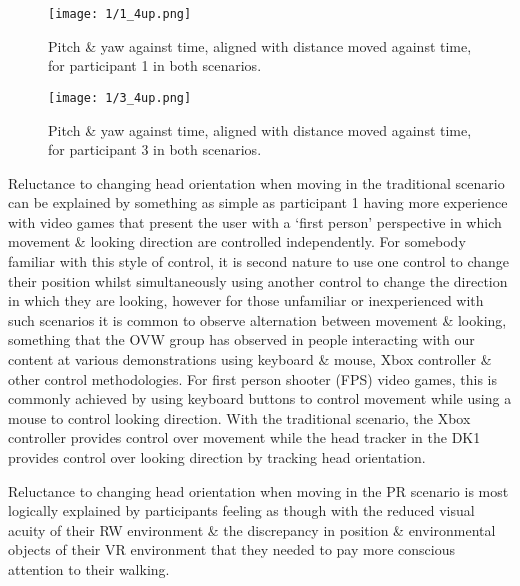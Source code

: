 \begin{figure}
	\begin{center}
	\texttt{[image: 1/1\_4up.png]}
	\caption{Pitch \& yaw against time, aligned with distance moved against time, for participant 1 in both scenarios.}
	\label{1_4up.png}
	\end{center}
\end{figure}

\begin{figure}
	\begin{center}
	\texttt{[image: 1/3\_4up.png]}
	\caption{Pitch \& yaw against time, aligned with distance moved against time, for participant 3 in both scenarios.}
	\label{3_4up.png}
	\end{center}
\end{figure}

Reluctance to changing head orientation when moving in the traditional scenario can be explained by something as simple as participant 1 having more experience with video games that present the user with a `first person' perspective in which movement \& looking direction are controlled independently. For somebody familiar with this style of control, it is second nature to use one control to change their position whilst simultaneously using another control to change the direction in which they are looking, however for those unfamiliar or inexperienced with such scenarios it is common to observe alternation between movement \& looking, something that the OVW group has observed in people interacting with our content at various demonstrations using keyboard \& mouse, Xbox controller \& other control methodologies. For first person shooter (FPS) video games, this is commonly achieved by using keyboard buttons to control movement while using a mouse to control looking direction. With the traditional scenario, the Xbox controller provides control over movement while the head tracker in the DK1 provides control over looking direction by tracking head orientation.

Reluctance to changing head orientation when moving in the PR scenario is most logically explained by participants feeling as though with the reduced visual acuity of their RW environment \& the discrepancy in position \& environmental objects of their VR environment that they needed to pay more conscious attention to their walking.


